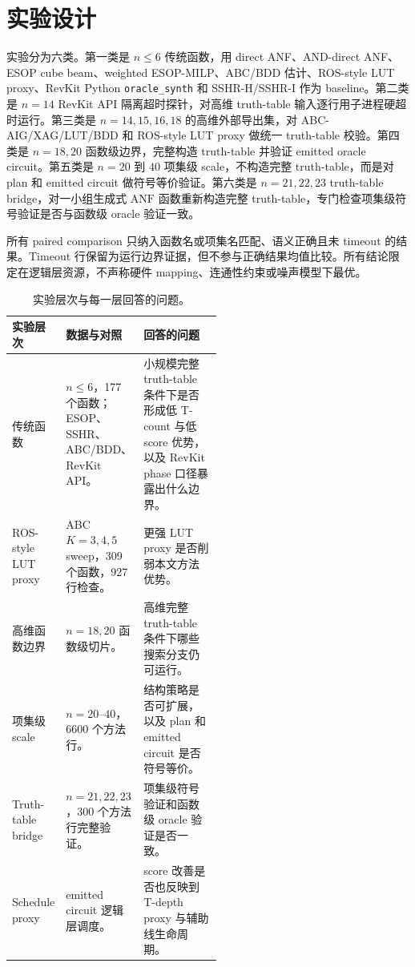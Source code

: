 \documentclass[UTF8,fontset=macnew,11pt]{ctexart}
\newcommand{\anf}{\ensuremath{\mathrm{ANF}}}
\newcommand{\ttable}{truth-table}
\begin{document}
\section{实验设计}

实验分为六类。第一类是 $n\leq6$ 传统函数，用 direct ANF、AND-direct ANF、ESOP cube beam、weighted ESOP-MILP、ABC/BDD 估计、ROS-style LUT proxy、RevKit Python \texttt{oracle\_synth} 和 SSHR-H/SSHR-I 作为 baseline。第二类是 $n=14$ RevKit API 隔离超时探针，对高维 truth-table 输入逐行用子进程硬超时运行。第三类是 $n=14,15,16,18$ 的高维外部导出集，对 ABC-AIG/XAG/LUT/BDD 和 ROS-style LUT proxy 做统一 truth-table 校验。第四类是 $n=18,20$ 函数级边界，完整构造 \ttable{} 并验证 emitted oracle circuit。第五类是 $n=20$ 到 $40$ 项集级 scale，不构造完整 \ttable{}，而是对 plan 和 emitted circuit 做符号等价验证。第六类是 $n=21,22,23$ truth-table bridge，对一小组生成式 \anf{} 函数重新构造完整 \ttable{}，专门检查项集级符号验证是否与函数级 oracle 验证一致。

所有 paired comparison 只纳入函数名或项集名匹配、语义正确且未 timeout 的结果。Timeout 行保留为运行边界证据，但不参与正确结果均值比较。所有结论限定在逻辑层资源，不声称硬件 mapping、连通性约束或噪声模型下最优。

\begin{table}[H]
\centering
\scriptsize
\caption{实验层次与每一层回答的问题。}
\label{tab:experiment-layers-v27}
\begin{tabularx}{\linewidth}{>{\raggedright\arraybackslash}p{0.22\linewidth}>{\raggedright\arraybackslash}p{0.30\linewidth}>{\raggedright\arraybackslash}X}
\toprule
实验层次 & 数据与对照 & 回答的问题 \\
\midrule
传统函数 & $n\leq6$，177 个函数；ESOP、SSHR、ABC/BDD、RevKit API。 & 小规模完整 truth-table 条件下是否形成低 T-count 与低 score 优势，以及 RevKit phase 口径暴露出什么边界。 \\
ROS-style LUT proxy & ABC $K=3,4,5$ sweep，309 个函数，927 行检查。 & 更强 LUT proxy 是否削弱本文方法优势。 \\
高维函数边界 & $n=18,20$ 函数级切片。 & 高维完整 truth-table 条件下哪些搜索分支仍可运行。 \\
项集级 scale & $n=20$--$40$，6600 个方法行。 & 结构策略是否可扩展，以及 plan 和 emitted circuit 是否符号等价。 \\
Truth-table bridge & $n=21,22,23$，300 个方法行完整验证。 & 项集级符号验证和函数级 oracle 验证是否一致。 \\
Schedule proxy & emitted circuit 逻辑层调度。 & score 改善是否也反映到 T-depth proxy 与辅助线生命周期。 \\
\bottomrule
\end{tabularx}
\end{table}
\end{document}
